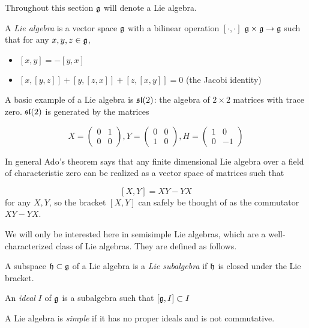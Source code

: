 Throughout this section $\mathfrak{g}$ will denote a Lie algebra.

A \emph{Lie algebra} is a vector space $\mathfrak{g}$ with a bilinear operation
$\left[ \cdot, \cdot \right]$  $\mathfrak{g} \times \mathfrak{g} \to
\mathfrak{g}$ such that for any $x,y,z\in \mathfrak{g}$,

\begin{itemize}
    \item $\left[ x,y \right] = -\left[ y,x \right]$
    \item $\left[ x, \left[ y,z \right] \right] + \left[ y, \left[ z,x \right] \right] + \left[ z, \left[ x,y \right] \right] = 0$ (the Jacobi identity)
\end{itemize}

A basic example of a Lie algebra is $\mathfrak{sl}(2)$: the algebra of $2 \times 2$
matrices with trace zero. $\mathfrak{sl}(2)$ is generated by the matrices 

\begin{equation}
    X = \begin{pmatrix} 0 & 1 \\ 0 & 0 \end{pmatrix},
    Y = \begin{pmatrix} 0 & 0 \\ 1 & 0 \end{pmatrix}, 
    H = \begin{pmatrix} 1 & 0 \\ 0 &-1 \end{pmatrix}
\end{equation}

In general Ado's theorem says that any finite dimensional Lie algebra over a
field of characteristic zero can be realized as a vector space of matrices such
that 

\[ \left[ X,Y \right] = XY - YX\] 
for any $X,Y$, so the bracket $[X,Y]$ can safely be thought of
as the commutator $XY - YX$. 


We will only be interested here in semisimple Lie algebras, which are a
well-characterized class of Lie algebras. They are defined as follows.

\begin{defn}
    A subspace $\mathfrak{h} \subset \mathfrak{g}$ of a Lie algebra is a
    \emph{Lie subalgebra} if $\mathfrak{h}$ is closed under the Lie bracket. 

    An \emph{ideal} $I$ of $\mathfrak{g}$ is a subalgebra such that
    $[\mathfrak{g}, I] \subset I$
\end{defn}

\begin{defn}
    A Lie algebra is \emph{simple} if it has no proper ideals and is not
    commutative. 
\end{defn}

